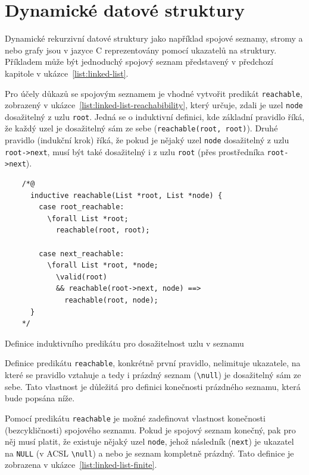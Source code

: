 \section{Dynamické datové struktury}
\label{sec:dynamicke-datove-struktury}

Dynamické rekurzivní datové struktury jako například spojové seznamy,
stromy a nebo grafy jsou v jazyce C reprezentovány pomocí ukazatelů na struktury.
Příkladem může být jednoduchý spojový seznam představený v předchozí kapitole v ukázce~\ref{list:linked-list}.


Pro účely důkazů se spojovým seznamem je vhodné vytvořit predikát \texttt{reachable},
zobrazený v ukázce~\ref{list:linked-list-reachabibility},
který určuje, zdali je uzel \texttt{node} dosažitelný z uzlu \texttt{root}.
Jedná se o induktivní definici,
kde základní pravidlo říká,
že každý uzel je dosažitelný sám ze sebe (\texttt{reachable(root, root)}).
Druhé pravidlo (indukční krok) říká,
že pokud je nějaký uzel \texttt{node} dosažitelný z uzlu \texttt{root->next},
musí být také dosažitelný i z uzlu \texttt{root} (přes prostředníka \texttt{root->next}).

\begin{listing}[H]
    \begin{verbatim}
    /*@
      inductive reachable(List *root, List *node) {
        case root_reachable:
          \forall List *root;
            reachable(root, root);

        case next_reachable:
          \forall List *root, *node;
            \valid(root)
            && reachable(root->next, node) ==>
              reachable(root, node);
      }
    */
    \end{verbatim}
    \caption{Definice induktivního predikátu pro dosažitelnost uzlu v seznamu}
    \label{list:linked-list-reachabibility}
\end{listing}

Definice predikátu \texttt{reachable}, konkrétně první pravidlo,
nelimituje ukazatele, na které se pravidlo vztahuje
a tedy i prázdný seznam (\texttt{\textbackslash null}) je dosažitelný sám ze sebe.
Tato vlastnost je důležitá pro definici konečnosti prázdného seznamu, která bude popsána níže.

Pomocí predikátu \texttt{reachable} je možné zadefinovat vlastnost konečnosti (bezcykličnosti) spojového seznamu.
Pokud je spojový seznam konečný, pak pro něj musí platit,
že existuje nějaký uzel \texttt{node},
jehož následník (\texttt{next}) je ukazatel na \texttt{NULL} (v ACSL \texttt{\textbackslash null})
a nebo je seznam kompletně prázdný.
Tato definice je zobrazena v ukázce~\ref{list:linked-list-finite}.

